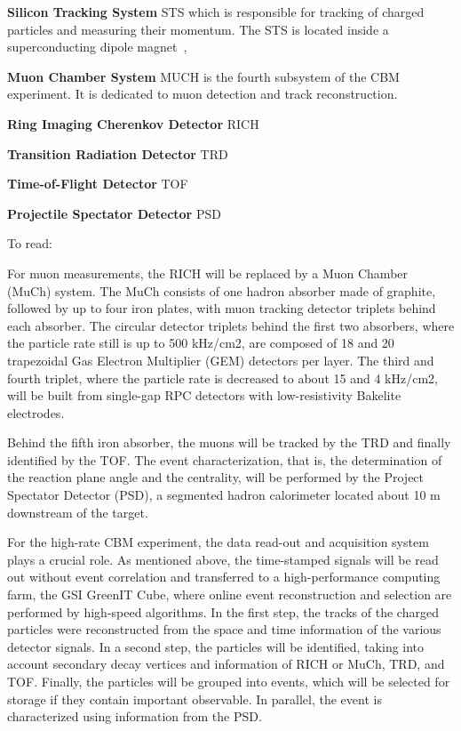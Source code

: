  \textbf{Silicon Tracking System} \gls{STS} which is responsible for tracking of charged particles and measuring their momentum. The \gls{STS} is located inside a superconducting dipole magnet~\cite{Malakhov:109025},
 
\textbf{Muon Chamber System} \gls{MUCH} is the fourth subsystem of the \gls{CBM} experiment. It is dedicated to muon detection and track reconstruction.

\textbf{Ring Imaging Cherenkov Detector} \gls{RICH}

\textbf{Transition Radiation Detector} \gls{TRD}

\textbf{Time-of-Flight Detector} \gls{TOF}


\textbf{Projectile Spectator Detector} \gls{PSD}



To read:

For muon measurements, the RICH will be replaced by a Muon Chamber (MuCh) system. The MuCh consists of one hadron absorber made of graphite, followed by up to four iron plates, with muon tracking detector triplets behind each absorber. The circular detector triplets behind the first two absorbers, where the particle rate still is up to 500 kHz/cm2, are composed of 18 and 20 trapezoidal Gas Electron
Multiplier (GEM) detectors per layer. The third and fourth triplet, where the particle rate is decreased to about 15 and 4 kHz/cm2, will be built from single-gap RPC detectors with low-resistivity Bakelite electrodes.

Behind the fifth iron absorber, the muons will be tracked by the TRD and finally identified by the TOF. The event characterization, that is, the determination of the reaction plane angle and the centrality, will be performed by the Project Spectator Detector (PSD), a segmented hadron calorimeter located about 10 m downstream of the target.

For the high-rate CBM experiment, the data read-out and acquisition system plays a crucial role. As mentioned above, the time-stamped signals will be read out without event correlation and transferred to a high-performance computing farm, the GSI GreenIT Cube, where online event reconstruction and selection are performed by high-speed algorithms. In the first step, the tracks of the charged particles were reconstructed from the space and time information of the various detector signals. In a second step, the particles will be identified, taking into account secondary decay vertices and information of RICH or MuCh, TRD, and TOF. Finally, the particles will be grouped into events, which will be selected for storage if they contain important observable. In parallel, the event is characterized using information from the PSD.



